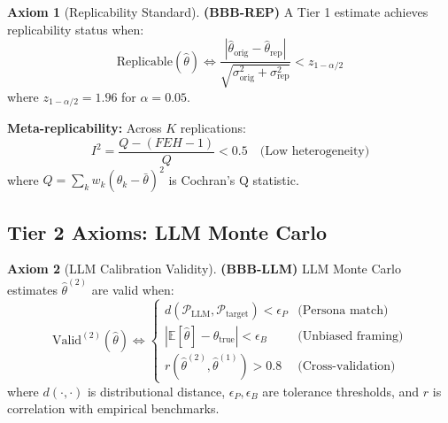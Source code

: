\documentclass[11pt,a4paper]{article}
\theoremstyle{definition}
\newtheorem{axiom}{Axiom}[section]
\begin{document}
\begin{axiom}[Replicability Standard]
\label{ax:bbb-rep}
\textbf{(BBB-REP)} A Tier 1 estimate achieves replicability status when:
\begin{equation}
\text{Replicable}(\hat{\theta}) \Leftrightarrow 
\frac{|\hat{\theta}_{\text{orig}} - \hat{\theta}_{\text{rep}}|}{\sqrt{\sigma^2_{\text{orig}} + \sigma^2_{\text{rep}}}} < z_{1-\alpha/2}
\end{equation}
where $z_{1-\alpha/2} = 1.96$ for $\alpha = 0.05$.

\textbf{Meta-replicability:} Across $K$ replications:
\begin{equation}
I^2 = \frac{Q - (FEH-1)}{Q} < 0.5 \quad \text{(Low heterogeneity)}
\end{equation}
where $Q = \sum_k w_k (\hat{\theta}_k - \bar{\theta})^2$ is Cochran's Q statistic.
\end{axiom}

\subsection{Tier 2 Axioms: LLM Monte Carlo}

\begin{axiom}[LLM Calibration Validity]
\label{ax:bbb-llm-full}
\textbf{(BBB-LLM)} LLM Monte Carlo estimates $\hat{\theta}^{(2)}$ are valid when:
\begin{equation}
\text{Valid}^{(2)}(\hat{\theta}) \Leftrightarrow 
\begin{cases}
d(\mathcal{P}_{\text{LLM}}, \mathcal{P}_{\text{target}}) < \epsilon_P & \text{(Persona match)} \\
|\mathbb{E}[\hat{\theta}] - \theta_{\text{true}}| < \epsilon_B & \text{(Unbiased framing)} \\
r(\hat{\theta}^{(2)}, \hat{\theta}^{(1)}) > 0.8 & \text{(Cross-validation)}
\end{cases}
\end{equation}
where $d(\cdot, \cdot)$ is distributional distance, $\epsilon_P, \epsilon_B$ are 
tolerance thresholds, and $r$ is correlation with empirical benchmarks.
\end{axiom}
\end{document}
